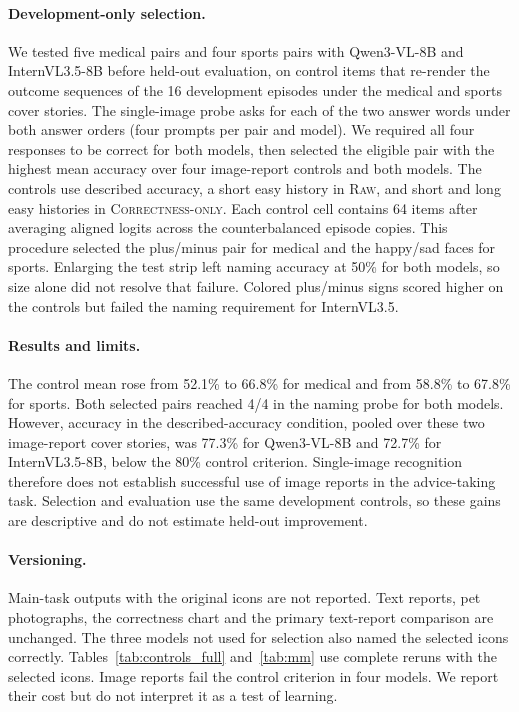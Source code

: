 \documentclass[letterpaper]{article} %
\newcommand{\Raw}{\textsc{Raw}}
\newcommand{\CorrectnessOnly}{\textsc{Correctness-only}}
\begin{document}
\paragraph{Development-only selection.} We tested five medical pairs and four sports pairs with Qwen3-VL-8B and InternVL3.5-8B before held-out evaluation, on control items that re-render the outcome sequences of the 16 development episodes under the medical and sports cover stories. The single-image probe asks for each of the two answer words under both answer orders (four prompts per pair and model). We required all four responses to be correct for both models, then selected the eligible pair with the highest mean accuracy over four image-report controls and both models. The controls use described accuracy, a short easy history in \Raw{}, and short and long easy histories in \CorrectnessOnly{}. Each control cell contains 64 items after averaging aligned logits across the counterbalanced episode copies. This procedure selected the plus/minus pair for medical and the happy/sad faces for sports. Enlarging the test strip left naming accuracy at 50\% for both models, so size alone did not resolve that failure. Colored plus/minus signs scored higher on the controls but failed the naming requirement for InternVL3.5.

\paragraph{Results and limits.} The control mean rose from 52.1\% to 66.8\% for medical and from 58.8\% to 67.8\% for sports. Both selected pairs reached 4/4 in the naming probe for both models. However, accuracy in the described-accuracy condition, pooled over these two image-report cover stories, was 77.3\% for Qwen3-VL-8B and 72.7\% for InternVL3.5-8B, below the 80\% control criterion. Single-image recognition therefore does not establish successful use of image reports in the advice-taking task. Selection and evaluation use the same development controls, so these gains are descriptive and do not estimate held-out improvement.

\paragraph{Versioning.} Main-task outputs with the original icons are not reported. Text reports, pet photographs, the correctness chart and the primary text-report comparison are unchanged. The three models not used for selection also named the selected icons correctly. Tables~\ref{tab:controls_full} and~\ref{tab:mm} use complete reruns with the selected icons. Image reports fail the control criterion in four models. We report their cost but do not interpret it as a test of learning.
\end{document}
